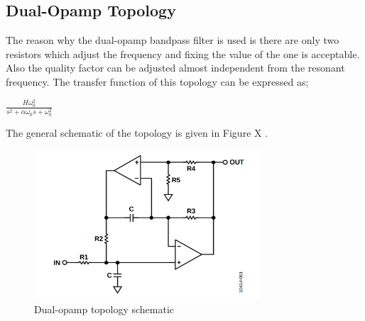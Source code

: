 \documentclass[letterpaper,12pt]{article}
\begin{document}
\subsection{Dual-Opamp Topology}
The reason why the dual-opamp bandpass filter is used is there are only two resistors which adjust the frequency and fixing the value of the one is acceptable. Also the quality factor can be adjusted almost independent from the resonant frequency. The transfer function of this topology can be expressed as;
\begin{center}
    $ \frac{H \omega_0^2 }{s^2 + \alpha \omega_0 s + \omega_0 ^2} $
    
\end{center}
The general schematic of the topology is given in Figure X .
\begin{figure}[H]
    \centering
    \includegraphics[width = 0.75\textwidth]{dualopamp.png}
    \caption{Dual-opamp topology schematic}
\end{figure} 
\end{document}

